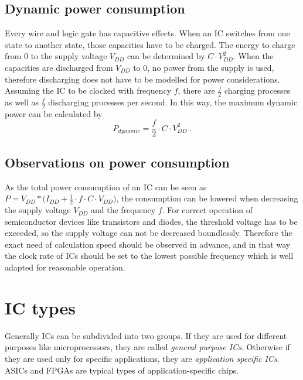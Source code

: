 \subsection{Dynamic power consumption}
Every wire and logic gate has capacitive effects. When an IC switches from one state to another state, those capacities have to be charged. The energy to charge from 0 to the supply voltage $V_{DD}$ can be determined by $C\cdot V_{DD}^2$. When the capacities are discharged from $V_{DD}$ to 0, no power from the supply is used\cite{Har13}, therefore discharging does not have to be modelled for power considerations. Assuming the IC to be clocked with frequency $f$, there are $\frac{f}{2}$ charging processes as well as $\frac{f}{2}$ discharging processes per second. In this way, the maximum dynamic power can be calculated by
\begin{equation}
P_{dynamic}=\frac{f}{2}\cdot C\cdot V_{DD}^2\;.
\end{equation}
\subsection{Observations on power consumption}
As the total power consumption of an IC can be seen as $P=V_{DD}*\big(I_{DD}+\frac{1}{2}\cdot f\cdot C\cdot V_{DD}\big)$, the consumption can be lowered when decreasing the supply voltage $V_{DD}$ and the frequency $f$. For correct operation of semiconductor devices like transistors and diodes, the threshold voltage has to be exceeded, so the supply voltage can not be decreased boundlessly. Therefore the exact need of calculation speed should be observed in advance, and in that way the clock rate of ICs should be set to the lowest possible frequency which is well adapted for reasonable operation. 
\section{IC types}
Generally ICs can be subdivided into two groups. If they are used for different purposes like microprocessors, they are called \textit{general purpose ICs}. Otherwise if they are used only for specific applications, they are \textit{application specific ICs}. ASICs and FPGAs are typical types of application-specific chips.
